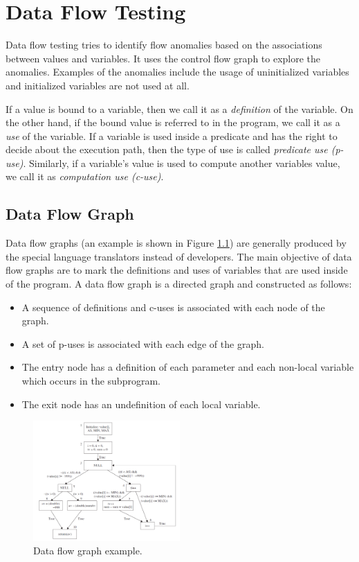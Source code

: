 \chapter{Data Flow Testing}
Data flow testing tries to identify flow anomalies based on the associations between values and variables. It uses the control flow graph to explore the anomalies. Examples of the anomalies include the usage of uninitialized variables and initialized variables are not used at all.

If a value is bound to a variable, then we call it as a \emph{definition} of the variable. On the other hand, if the bound value is referred to in the program, we call it as a \emph{use} of the variable. If a variable is used inside a predicate and has the right to decide about the execution path, then the type of use is called \emph{predicate use (p-use)}. Similarly, if a variable's value is used to compute another variables value, we call it as \emph{computation use (c-use)}.

\section{Data Flow Graph}
Data flow graphs (an example is shown in Figure \ref{fig:data-flow-graph}) are generally produced by the special language translators instead of developers. The main objective of data flow graphs are to mark the definitions and uses of variables that are used inside of the program. A data flow graph is a directed graph and constructed as follows:
\begin{itemize}[noitemsep]
    \item A sequence of definitions and c-uses is associated with each node of the graph.
    \item A set of p-uses is associated with each edge of the graph.
    \item The entry node has a definition of each parameter and each non-local variable which occurs in the subprogram.
    \item The exit node has an undefinition of each local variable.
\end{itemize}

\begin{figure}[H]
    \centering
    \includegraphics[width=0.5\textwidth]{images/data-flow-graph.png}
    \caption{Data flow graph example.}
    \label{fig:data-flow-graph}
\end{figure}

